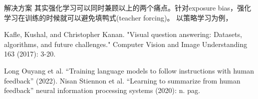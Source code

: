 \documentclass[UTF8]{ctexart}
\begin{document}
    解决方案
    其实强化学习可以同时兼顾以上的两个痛点。针对exposure bias，强化学习在训练的时候就可以避免填鸭式(teacher forcing)。
    以策略学习为例，



    \begin{thebibliography}{8}
        Kafle, Kushal, and Christopher Kanan.
        "Visual question answering: Datasets, algorithms, and future challenges."
        Computer Vision and Image Understanding 163 (2017): 3-20.

        Long Ouyang et al. “Training language models to follow instructions with human feedback”  (2022).
        Nisan Stiennon et al. “Learning to summarize from human feedback” neural information processing systems (2020): n. pag.
    \end{thebibliography}
\end{document}
